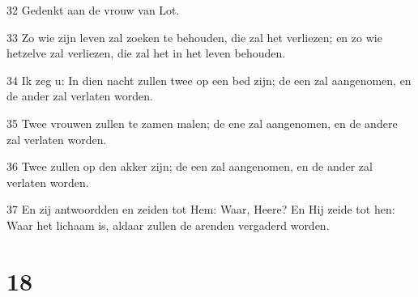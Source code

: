 \par 32 Gedenkt aan de vrouw van Lot.
\par 33 Zo wie zijn leven zal zoeken te behouden, die zal het verliezen; en zo wie hetzelve zal verliezen, die zal het in het leven behouden.
\par 34 Ik zeg u: In dien nacht zullen twee op een bed zijn; de een zal aangenomen, en de ander zal verlaten worden.
\par 35 Twee vrouwen zullen te zamen malen; de ene zal aangenomen, en de andere zal verlaten worden.
\par 36 Twee zullen op den akker zijn; de een zal aangenomen, en de ander zal verlaten worden.
\par 37 En zij antwoordden en zeiden tot Hem: Waar, Heere? En Hij zeide tot hen: Waar het lichaam is, aldaar zullen de arenden vergaderd worden.

\chapter{18}

